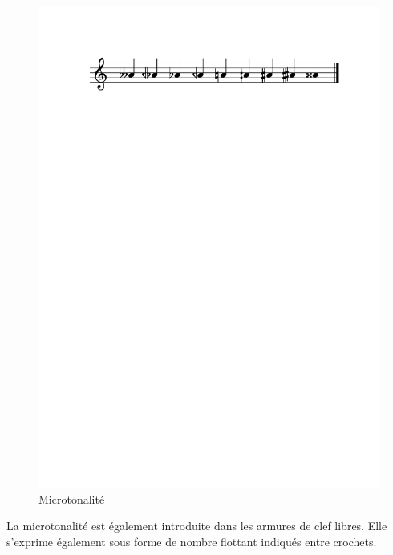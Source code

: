 \documentclass{article}
\begin{document}
\begin{figure}[h]
\centering
\includegraphics[width=\columnwidth]{img/partitions/alter.pdf}
\caption{Microtonalité}
\label{fig:alter}
\end{figure}

La microtonalité est également introduite dans les armures de clef libres. Elle s'exprime également sous forme de nombre flottant indiqués entre crochets.
\end{document}
